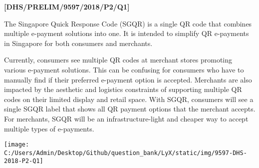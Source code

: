 \item \textbf{{[}DHS/PRELIM/9597/2018/P2/Q1{]} }

The Singapore Quick Response Code (SGQR) is a single QR code that
combines multiple e-payment solutions into one. It is intended to
simplify QR e-payments in Singapore for both consumers and merchants.

Currently, consumers see multiple QR codes at merchant stores promoting
various e-payment solutions. This can be confusing for consumers who
have to manually find if their preferred e-payment option is accepted.
Merchants are also impacted by the aesthetic and logistics constraints
of supporting multiple QR codes on their limited display and retail
space. With SGQR, consumers will see a single SGQR label that shows
all QR payment options that the merchant accepts. For merchants, SGQR
will be an infrastructure-light and cheaper way to accept multiple
types of e-payments.
\begin{center}
\texttt{[image: C:/Users/Admin/Desktop/Github/question\_bank/LyX/static/img/9597-DHS-2018-P2-Q1]}
\par\end{center}

